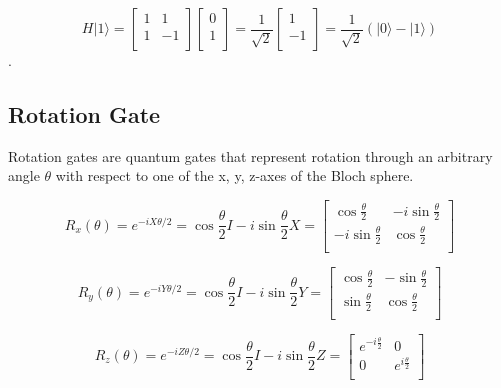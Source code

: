 \begin{equation}
H|1\rangle = \begin{bmatrix}
1 & 1\\
1 & -1 \\
\end{bmatrix} 
\left[
\begin{array}{c}
0 \\
1  \\
\end{array}
\right]
= \frac{1}{\sqrt{2}} \left[
\begin{array}{c}
1 \\
-1 \\
\end{array}
\right]
=\frac{1}{\sqrt{2}} (|0\rangle - |1\rangle)
\end{equation}.

\subsection{Rotation Gate}

Rotation gates are quantum gates that represent rotation through an arbitrary angle $\theta$ with respect to one of the x, y, z-axes of the Bloch sphere.

\begin{equation}
  R_x(\theta) = e^{-iX\theta/2} = \cos \frac{\theta}{2}I - i \sin\frac{\theta}{2}X = \begin{bmatrix}
    \cos \frac{\theta}{2} & -i \sin \frac{\theta}{2} \\
    -i \sin \frac{\theta}{2} & \cos \frac{\theta}{2} \\
    \end{bmatrix} 
\end{equation}

\begin{equation}
  R_y(\theta) = e^{-iY\theta/2} = \cos \frac{\theta}{2}I - i \sin\frac{\theta}{2}Y = \begin{bmatrix}
    \cos \frac{\theta}{2} & -\sin \frac{\theta}{2} \\
    \sin \frac{\theta}{2} & \cos \frac{\theta}{2} \\
    \end{bmatrix} 
\end{equation}

\begin{equation}
  R_z(\theta) = e^{-iZ\theta/2} = \cos \frac{\theta}{2}I - i \sin\frac{\theta}{2}Z = \begin{bmatrix}
    e^{-i \frac{\theta}{2}} & 0 \\
    0 & e^{i \frac{\theta}{2}} \\
    \end{bmatrix} 
\end{equation}

